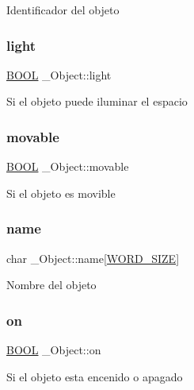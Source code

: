 Identificador del objeto \mbox{\label{struct__Object_a213da2eaffd083a65a4109f96be560b4}} 
\subsubsection{\texorpdfstring{light}{light}}
{\footnotesize\ttfamily \hyperlink{types_8h_a3e5b8192e7d9ffaf3542f1210aec18dd}{B\+O\+OL} \+\_\+\+Object\+::light}

Si el objeto puede iluminar el espacio \mbox{\label{struct__Object_ae013850f78da07c39e530f36bf98f2b9}} 
\subsubsection{\texorpdfstring{movable}{movable}}
{\footnotesize\ttfamily \hyperlink{types_8h_a3e5b8192e7d9ffaf3542f1210aec18dd}{B\+O\+OL} \+\_\+\+Object\+::movable}

Si el objeto es movible \mbox{\label{struct__Object_a3dab853826b88558a2c07dec50b96d57}} 
\subsubsection{\texorpdfstring{name}{name}}
{\footnotesize\ttfamily char \+\_\+\+Object\+::name\mbox{[}\hyperlink{types_8h_a92ed8507d1cd2331ad09275c5c4c1c89}{W\+O\+R\+D\+\_\+\+S\+I\+ZE}\mbox{]}}

Nombre del objeto \mbox{\label{struct__Object_a325dedec5324e588d2a86e7ffa478350}} 
\subsubsection{\texorpdfstring{on}{on}}
{\footnotesize\ttfamily \hyperlink{types_8h_a3e5b8192e7d9ffaf3542f1210aec18dd}{B\+O\+OL} \+\_\+\+Object\+::on}

Si el objeto esta encenido o apagado \mbox{\label{struct__Object_a0922dd9891e6aa617ce1d51ae27c0175}} 
